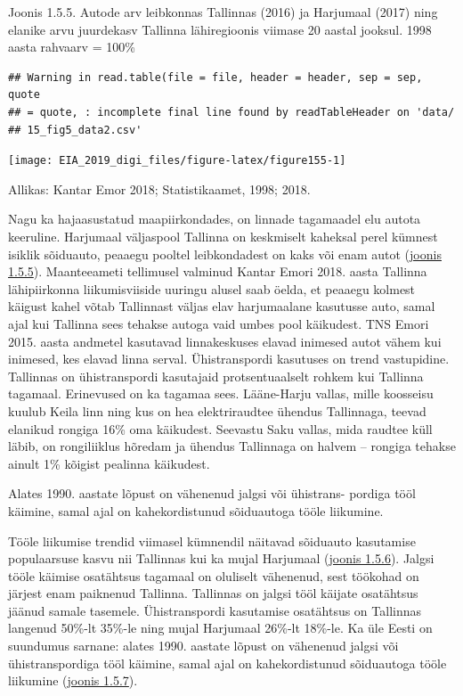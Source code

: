 \documentclass[estonian,]{article}
\begin{document}
{Joonis 1.5.5.} Autode arv leibkonnas Tallinnas (2016) ja Harjumaal (2017) ning elanike arvu juurdekasv Tallinna lähiregioonis viimase 20 aastal jooksul. 1998 aasta rahvaarv = 100\%

\begin{verbatim}
## Warning in read.table(file = file, header = header, sep = sep, quote
## = quote, : incomplete final line found by readTableHeader on 'data/
## 15_fig5_data2.csv'
\end{verbatim}

\begin{center}\texttt{[image: EIA\_2019\_digi\_files/figure-latex/figure155-1]} \end{center}

\begin{imgsource}
{Allikas:} Kantar Emor 2018; Statistikaamet, 1998; 2018.
\end{imgsource}

Nagu ka hajaasustatud maapiirkondades, on linnade tagamaadel elu autota keeruline. Harjumaal väljaspool Tallinna on keskmiselt kaheksal perel kümnest isiklik sõiduauto, peaaegu pooltel leibkondadest on kaks või enam autot (\protect\hyperlink{figure155}{joonis 1.5.5}). Maanteeameti tellimusel valminud Kantar Emori 2018. aasta Tallinna lähipiirkonna liikumisviiside uuringu alusel saab öelda, et peaaegu kolmest käigust kahel võtab Tallinnast väljas elav harjumaalane kasutusse auto, samal ajal kui Tallinna sees tehakse autoga vaid umbes pool käikudest. TNS Emori 2015. aasta andmetel kasutavad linnakeskuses elavad inimesed autot vähem kui inimesed, kes elavad linna serval. Ühistranspordi kasutuses on trend vastupidine. Tallinnas on ühistranspordi kasutajaid protsentuaalselt rohkem kui Tallinna tagamaal. Erinevused on ka tagamaa sees. Lääne-Harju vallas, mille koosseisu kuulub Keila linn ning kus on hea elektriraudtee ühendus Tallinnaga, teevad elanikud rongiga 16\% oma käikudest. Seevastu Saku vallas, mida raudtee küll läbib, on rongiliiklus hõredam ja ühendus Tallinnaga on halvem -- rongiga tehakse ainult 1\% kõigist pealinna käikudest.

\begin{blockquote-left}
Alates 1990. aastate lõpust on vähenenud jalgsi või ühistrans- pordiga
tööl käimine, samal ajal on kahekordistunud sõiduautoga tööle liikumine.
\end{blockquote-left}

Tööle liikumise trendid viimasel kümnendil näitavad sõiduauto kasutamise populaarsuse kasvu nii Tallinnas kui ka mujal Harjumaal (\protect\hyperlink{figure156}{joonis 1.5.6}). Jalgsi tööle käimise osatähtsus tagamaal on oluliselt vähenenud, sest töökohad on järjest enam paiknenud Tallinna. Tallinnas on jalgsi tööl käijate osatähtsus jäänud samale tasemele. Ühistranspordi kasutamise osatähtsus on Tallinnas langenud 50\%-lt 35\%-le ning mujal Harjumaal 26\%-lt 18\%-le. Ka üle Eesti on suundumus sarnane: alates 1990. aastate lõpust on vähenenud jalgsi või ühistranspordiga tööl käimine, samal ajal on kahekordistunud sõiduautoga tööle liikumine (\protect\hyperlink{figure157}{joonis 1.5.7}).
\end{document}

